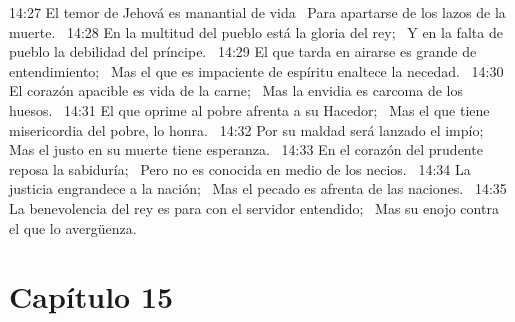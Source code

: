 14:27 El temor de Jehová es manantial de vida  
Para apartarse de los lazos de la muerte.  
14:28 En la multitud del pueblo está la gloria del rey;  
Y en la falta de pueblo la debilidad del príncipe.  
14:29 El que tarda en airarse es grande de entendimiento;  
Mas el que es impaciente de espíritu enaltece la necedad.  
14:30 El corazón apacible es vida de la carne;  
Mas la envidia es carcoma de los huesos.  
14:31 El que oprime al pobre afrenta a su Hacedor;  
Mas el que tiene misericordia del pobre, lo honra.  
14:32 Por su maldad será lanzado el impío;  
Mas el justo en su muerte tiene esperanza.  
14:33 En el corazón del prudente reposa la sabiduría;  
Pero no es conocida en medio de los necios.  
14:34 La justicia engrandece a la nación;  
Mas el pecado es afrenta de las naciones.  
14:35 La benevolencia del rey es para con el servidor entendido;  
Mas su enojo contra el que lo avergüenza.  
\section*{Capítulo 15 }


